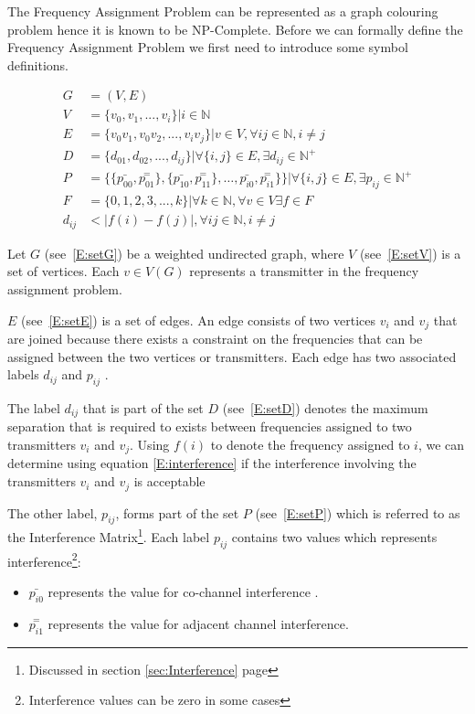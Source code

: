 The Frequency Assignment Problem can be represented as a graph colouring problem hence it is known to be NP-Complete. Before we can formally define the Frequency Assignment Problem we first need to introduce some symbol definitions.

\begin{align}
	G &= (V,E) \label{E:setG}\\
	V &= \{v_{0},v_{1},...,v_{i}\} | i \in \mathbb{N} \label{E:setV}\\
	E &= \{v_0v_1,v_0v_2,...,v_iv_j\}|v \in V,\forall ij \in \mathbb{N},i \neq j \label{E:setE}\\
	D &= \{d_{01},d_{02},...,d_{ij}\}| \forall\{i,j\} \in E, \exists d_{ij} \in \mathbb{N}^+ \label{E:setD}\\
	P &= \{\{\bar{p_{00}},\overset{=}{p_{01}}\},\{\bar{p_{10}},\overset{=}{p_{11}}\},\ldots,\bar{p_{i0}},\overset{=}{p_{i1}}\}\}| \forall \{i,j\} \in E,\exists p_{ij} \in \mathbb{N}^+ \label{E:setP}\\
	F &= \{0,1,2,3,...,k\}| \forall k \in \mathbb{N},\forall v \in V \exists f \in F\label{E:setF}\\
	d_{ij} &< |f(i) - f(j)|, \forall ij \in \mathbb{N},i \neq j \label{E:interference}
\end{align}

Let $G$ (see~\ref{E:setG}) be a weighted undirected graph, where $V$ (see~\ref{E:setV}) is a set of vertices. Each $v \in V(G)$ represents a transmitter in the frequency assignment problem. 

$E$ (see~\ref{E:setE}) is a set of edges. An edge consists of two vertices $v_i$ and $v_j$ that are joined because there exists a constraint on the frequencies that can be assigned between the two vertices or transmitters. Each edge has two associated labels $d_{ij}$ and $p_{ij}$ \cite{FAPOrientationModel,TabuMontemanniSmith}. 

The label $d_{ij}$ that is part of the set $D$ (see~\ref{E:setD}) denotes the maximum separation that is required to exists between frequencies assigned to two transmitters $v_i$ and $v_j$. Using $f(i)$ to denote the frequency assigned to $i$, we can determine using equation \ref{E:interference} if the interference involving the transmitters $v_i$ and $v_j$ is acceptable\cite{FAPOrientationModel,TabuMontemanniSmith}

The other label, $p_{ij}$, forms part of the set $P$ (see~\ref{E:setP}) which is referred to as the Interference Matrix\footnote{Discussed in section \ref{sec:Interference} page \pageref{sec:Interference}}. Each label $p_{ij}$ contains two values which represents interference\footnote{Interference values can be zero in some cases}:
\begin{itemize}
\item $\bar{p_{i0}}$ represents the value for co-channel interference \cite{FAPOrientationModel,TabuMontemanniSmith}. 
\item $\overset{=}{p_{i1}}$ represents the value for adjacent channel interference\cite{FAPOrientationModel,TabuMontemanniSmith}.
\end{itemize}

